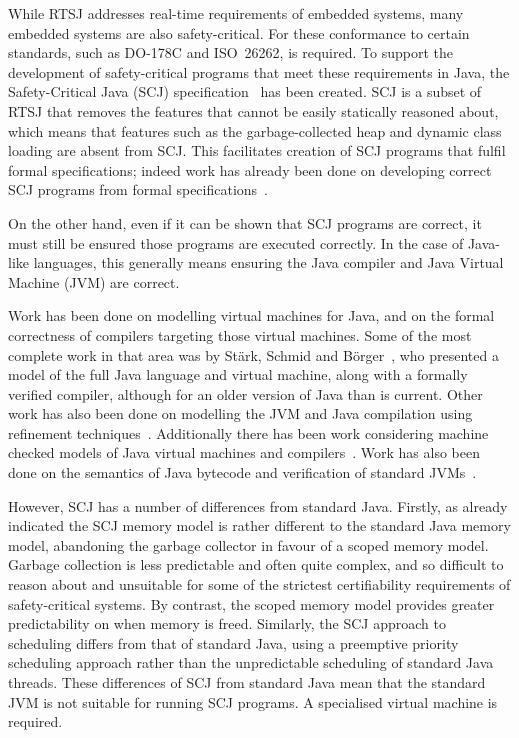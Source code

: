 While RTSJ addresses real-time requirements of embedded systems, many
embedded systems are also safety-critical.
For these conformance to certain standards, such as \mbox{DO-178C} and
ISO~26262, is required.
To support the development of safety-critical programs that meet these
requirements in Java, the Safety-Critical Java (SCJ)
specification~\cite{locke2013} has been created.
SCJ is a subset of RTSJ that removes the features that cannot be
easily statically reasoned about, which means that features such as
the garbage-collected heap and dynamic class loading are absent from
SCJ.
This facilitates creation of SCJ programs that fulfil formal
specifications; indeed work has already been done on developing
correct SCJ programs from formal specifications~\cite{cavalcanti2011,
  cavalcanti2013}.

On the other hand, even if it can be shown that SCJ programs are
correct, it must still be ensured those programs are executed
correctly.
In the case of Java-like languages, this generally means ensuring the
Java compiler and Java Virtual Machine (JVM) are correct.

Work has been done on modelling virtual machines for Java, and on the
formal correctness of compilers targeting those virtual machines.
Some of the most complete work in that area was by St\"{a}rk, Schmid
and B\"{o}rger~\cite{stark2001}, who presented a model of the full
Java language and virtual machine, along with a formally verified
compiler, although for an older version of Java than is current.
Other work has also been done on modelling the JVM and Java
compilation using refinement techniques~\cite{duran2010}.
Additionally there has been work considering machine checked models of
Java virtual machines and compilers~\cite{lochbihler2012, nipkow2000,
  strecker2002}.
Work has also been done on the semantics of Java bytecode and
verification of standard JVMs~\cite{bertelsen2000, jones1998}.

However, SCJ has a number of differences from standard Java.
Firstly, as already indicated the SCJ memory model is rather different
to the standard Java memory model, abandoning the garbage collector in
favour of a scoped memory model.
Garbage collection is less predictable and often quite complex, and so
difficult to reason about and unsuitable for some of the strictest
certifiability requirements of safety-critical systems.
By contrast, the scoped memory model provides greater predictability
on when memory is freed.
Similarly, the SCJ approach to scheduling differs from that of
standard Java, using a preemptive priority scheduling approach rather
than the unpredictable scheduling of standard Java threads.
These differences of SCJ from standard Java mean that the standard JVM
is not suitable for running SCJ programs.
A specialised virtual machine is required.

